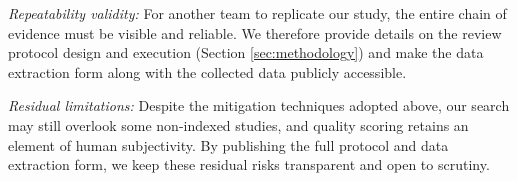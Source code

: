 \textit{Repeatability validity: } For another team to replicate our study, the entire chain of evidence must be visible and reliable. We therefore provide details on the review protocol design and execution (Section \ref{sec:methodology}) and make the data extraction form along with the collected data publicly accessible. 

\textit{Residual limitations: } Despite the mitigation techniques adopted above, our search may still overlook some non-indexed studies, and quality scoring retains an element of human subjectivity. By publishing the full protocol and data extraction form, we keep these residual risks transparent and open to scrutiny.

